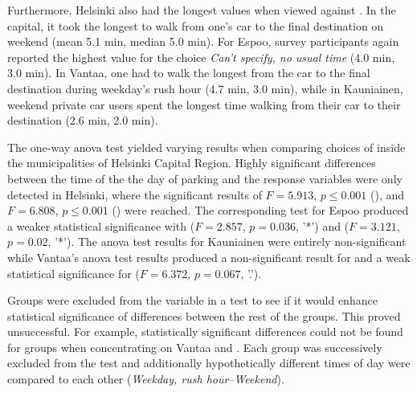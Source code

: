 Furthermore, Helsinki also had the longest  values when viewed against . In the capital, it took the longest to walk from one's car to the final destination on weekend (mean 5.1 min, median 5.0 min). For Espoo, survey participants again reported the highest  value for the choice \textit{Can't specify, no usual time} (4.0 min, 3.0 min). In Vantaa, one had to walk the longest from the car to the final destination during weekday's rush hour (4.7 min, 3.0 min), while in Kauniainen, weekend private car users spent the longest time walking from their car to their destination (2.6 min, 2.0 min).

The one-way \acrshort{anova} test yielded varying results when comparing choices of  inside the municipalities of Helsinki Capital Region. Highly significant differences between the time of the the day of parking and the response variables were only detected in Helsinki, where the significant results of $F = 5.913$, $p \leq 0.001$ (), and $F = 6.808$, $p \leq 0.001$ () were reached. The corresponding test for Espoo produced a weaker statistical significance with  ($F = 2.857$, $p = 0.036$, '*') and  ($F = 3.121$, $p = 0.02$, '*'). The \acrshort{anova} test results for Kauniainen were entirely non-significant while Vantaa's \acrshort{anova} test results produced a non-significant result for  and a weak statistical significance for  ($F = 6.372$, $p = 0.067$, '.').

Groups were excluded from the variable  in a test to see if it would enhance statistical significance of differences between the rest of the groups. This proved unsuccessful. For example, statistically significant differences could not be found for  groups when concentrating on Vantaa and . Each group was successively excluded from the test and additionally hypothetically different times of day were compared to each other (\textit{Weekday, rush hour}--\textit{Weekend}).

